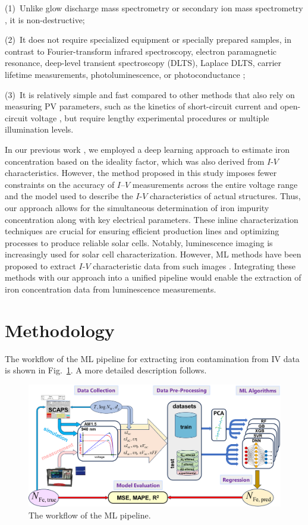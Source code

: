 \documentclass[a4paper,fleqn,draft]{cas-sc}
\begin{document}
\noindent
(1)~Unlike glow discharge mass spectrometry or secondary ion mass spectrometry \cite{DiSabatino2014}, it is non-destructive;

\noindent
(2)~It does not require specialized equipment or specially prepared samples, in contrast
to Fourier-transform infrared spectroscopy, electron paramagnetic resonance, deep-level transient spectroscopy (DLTS),
Laplace DLTS, carrier lifetime measurements, photoluminescence, or photoconductance
\cite{Schroder2006, HowMuchPhysics, LaplDLTS, Rein2, Schmidt2005, FeMethod2012, Goodarzi2017};

\noindent
(3)~It is relatively simple and fast compared to other methods that also rely on measuring PV parameters,
such as the kinetics of short-circuit current \cite{Olikh2021JAP} and open-circuit voltage \cite{Herguth2022},
but require lengthy experimental procedures or multiple illumination levels.

In our previous work \cite{Olikh2022PPV},
we employed a deep learning approach to estimate iron concentration based on the ideality factor,
which was also derived from $I$-$V$ characteristics.
However, the method proposed in this study imposes fewer constraints on the accuracy of $I$–$V$ measurements across the entire voltage range
and the model used to describe the $I$-$V$ characteristics of actual structures.
Thus, our approach allows for the simultaneous determination of iron impurity concentration along with key electrical parameters.
These inline characterization techniques are crucial for ensuring efficient production lines and optimizing processes to produce reliable solar cells.
Notably, luminescence imaging is increasingly used for solar cell characterization.
However, ML methods have been proposed to extract $I$-$V$ characteristic data from such images \cite{Kunze2023, Battaglia2023}.
Integrating these methods with our approach into a unified pipeline would enable the extraction of iron concentration data from luminescence measurements.

\section{Methodology}
The workflow of the ML pipeline for extracting iron contamination from IV data is shown in Fig.~\ref{fig1}.
 A more detailed description follows.

\begin{figure}
	\centering
		\includegraphics[width=0.9\linewidth]{Fig1.png}
	  \caption{The workflow of the ML pipeline.}\label{fig1}
\end{figure}
\end{document}
